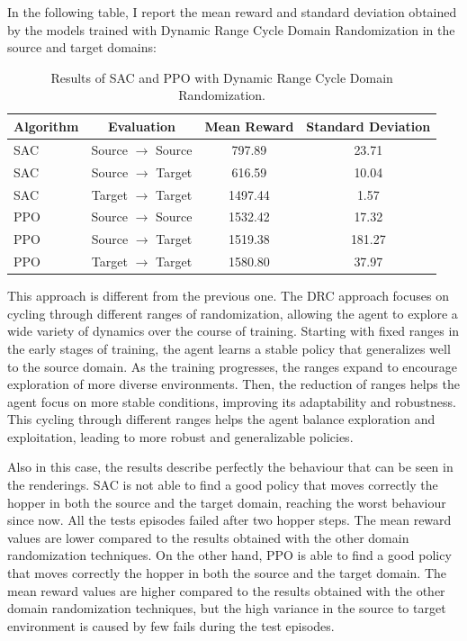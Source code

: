 \documentclass[12pt]{article}
\begin{document}
In the following table, I report the mean reward and standard deviation obtained by the models trained with Dynamic Range Cycle Domain Randomization in the source and target domains:

\begin{table}[H]
    \centering
    \begin{tabular}{|l|c|c|c|}
        \hline
        \textbf{Algorithm} & \textbf{Evaluation} & \textbf{Mean Reward} & \textbf{Standard Deviation} \\ \hline
        SAC & Source $\rightarrow$ Source & 797.89 & 23.71 \\ 
        SAC & Source $\rightarrow$ Target & 616.59 & 10.04 \\ 
        SAC & Target $\rightarrow$ Target & 1497.44 & 1.57 \\ \hline
        PPO & Source $\rightarrow$ Source & 1532.42 & 17.32 \\ 
        PPO & Source $\rightarrow$ Target & 1519.38 & 181.27 \\ 
        PPO & Target $\rightarrow$ Target & 1580.80 & 37.97 \\ \hline
    \end{tabular}
    \caption{Results of SAC and PPO with Dynamic Range Cycle Domain Randomization.}
    \label{tab:results_drc}
\end{table}

This approach is different from the previous one. The DRC approach focuses on cycling through different ranges of randomization, allowing the agent to explore a wide variety of dynamics over the course of training. Starting with fixed ranges in the early stages of training, the agent learns a stable policy that generalizes well to the source domain. As the training progresses, the ranges expand to encourage exploration of more diverse environments. Then, the reduction of ranges helps the agent focus on more stable conditions, improving its adaptability and robustness. This cycling through different ranges helps the agent balance exploration and exploitation, leading to more robust and generalizable policies.

Also in this case, the results describe perfectly the behaviour that can be seen in the renderings. SAC is not able to find a good policy that moves correctly the hopper in both the source and the target domain, reaching the worst behaviour since now. All the tests episodes failed after two hopper steps. The mean reward values are lower compared to the results obtained with the other domain randomization techniques. On the other hand, PPO is able to find a good policy that moves correctly the hopper in both the source and the target domain. The mean reward values are higher compared to the results obtained with the other domain randomization techniques, but the high variance in the source to target environment is caused by few fails during the test episodes.
\end{document}
